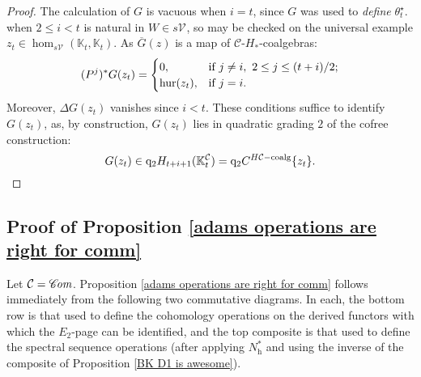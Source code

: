 \documentclass[11pt]{amsart} \renewcommand{\baselinestretch}{1.2}
\theoremstyle{plain}
\numberwithin{equation}{section} %
\theoremstyle{plain}
\numberwithin{equation}{chapter} %
\newcommand{\DASH}{\mathrm{-}}
\renewcommand{\to}{\longrightarrow}
\newcommand{\scrC}{\mathscr{C}}
\newcommand{\calV}{\mathcal{V}}
\newcommand{\calc}{\mathcal{C}}
\newcommand{\vect}[2]{\calV^{#1}_{#2}}
\newcommand{\HC}[1]{H#1\mathrm{-coalg}}
\newcommand{\quadgrad}[1]{\mathrm{q}_{#1}}
\newcommand{\algs}{{\scrC\!\textit{\normalfont\textit{om}}}}
\newcommand{\dhor}{_\mathrm{h}}
\renewcommand{\mapsto}{\longmapsto}
\newcommand{\SubsectionOrSection}[1]{\subsection{#1}}
\begin{document}
\begin{Operations on the Bousfield-Kan spectral sequence}
\begin{proof}
The calculation of $G$ is vacuous when $i=t$, since  $G$ was used to \emph{define} $\theta^\star_t$. when $2\leq i <t$ is natural in $W\in s\vect{}{}$, so may be checked on the universal example $ z_t\in \hom_{s\vect{}{}}(\mathbb{K}_t,\mathbb{K}_t)$. As $\overline{G}( z)$ is a map of $\calc$-$H_*$-coalgebras: 
\[(P^j)^*G( z_t)=\begin{cases}
0,&\textup{if }j\neq i,\ 2\leq j\leq (t+i)/2;\\
\textup{hur}( z_t),&\textup{if }j=i.
\end{cases}
\]
Moreover, $\Delta G( z_t)$ vanishes since $i<t$. %
These conditions suffice to identify $G( z_t)$, as, by construction, $G( z_t)$ lies in quadratic grading $2$ of the cofree construction:
\[G( z_t)\in\quadgrad{2}H_{t+i+1}(\mathbb{K}^{\calc}_t)=\quadgrad{2}C^{\HC{\calc}}\{ z_t\}.\qedhere\]
%
\end{proof}





\SubsectionOrSection{Proof of Proposition \ref{adams operations are right for comm}} 
\label{proof of prop: adams operations are right for comm}
Let $\calc=\algs$. Proposition \ref{adams operations are right for comm} follows immediately from the following two commutative diagrams. In each, the bottom row is that used to define the cohomology operations on the derived functors with which the $E_2$-page can be identified, and the top composite is that used to define the spectral sequence operations (after applying $N\dhor^*$ and using the inverse of the composite of Proposition \ref{BK D1 is awesome}).


\end{Operations on the Bousfield-Kan spectral sequence}
\end{document}
